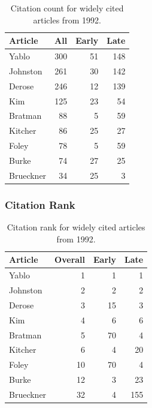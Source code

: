\documentclass[
  10pt,
  letterpaper,
  DIV=11,
  numbers=noendperiod,
  twoside]{scrartcl}
\begin{document}
\begin{longtable}[]{@{}lrrr@{}}

\caption{\label{tbl-citation-count-1992}Citation count for widely cited
articles from 1992.}

\tabularnewline

\toprule\noalign{}
Article & All & Early & Late \\
\midrule\noalign{}
\endhead
\bottomrule\noalign{}
\endlastfoot
Yablo & 300 & 51 & 148 \\
Johnston & 261 & 30 & 142 \\
Derose & 246 & 12 & 139 \\
Kim & 125 & 23 & 54 \\
Bratman & 88 & 5 & 59 \\
Kitcher & 86 & 25 & 27 \\
Foley & 78 & 5 & 59 \\
Burke & 74 & 27 & 25 \\
Brueckner & 34 & 25 & 3 \\

\end{longtable}

\subsubsection*{Citation Rank}\label{citation-rank-16}

\begin{longtable}[]{@{}lrrr@{}}

\caption{\label{tbl-citation-rank-1992}Citation rank for widely cited
articles from 1992.}

\tabularnewline

\toprule\noalign{}
Article & Overall & Early & Late \\
\midrule\noalign{}
\endhead
\bottomrule\noalign{}
\endlastfoot
Yablo & 1 & 1 & 1 \\
Johnston & 2 & 2 & 2 \\
Derose & 3 & 15 & 3 \\
Kim & 4 & 6 & 6 \\
Bratman & 5 & 70 & 4 \\
Kitcher & 6 & 4 & 20 \\
Foley & 10 & 70 & 4 \\
Burke & 12 & 3 & 23 \\
Brueckner & 32 & 4 & 155 \\

\end{longtable}
\end{document}
